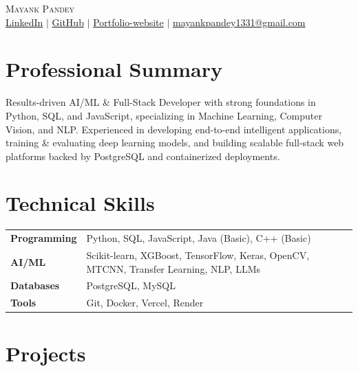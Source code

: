 \documentclass[letterpaper,10pt]{article}
\begin{document}
\begin{center}
    {\Huge \scshape Mayank Pandey} \\ \vspace{4pt}
    \small 
    \href{https://linkedin.com/in/mayank-pandey1331}{LinkedIn} 
    $|$ \href{https://github.com/MAYANK479}{GitHub} 
    $|$ \href{https://portfolio-mayank-projects1.vercel.app}{Portfolio-website} 
    $|$ \href{mailto:mayankpandey1331@gmail.com}{mayankpandey1331@gmail.com}
\end{center}

\section{Professional Summary}
\small{Results-driven AI/ML \& Full-Stack Developer with strong foundations in Python, SQL, and JavaScript, specializing in Machine Learning, Computer Vision, and NLP. Experienced in developing end-to-end intelligent applications, training \& evaluating deep learning models, and building scalable full-stack web platforms backed by PostgreSQL and containerized deployments.}

\section{Technical Skills}
\begin{tabularx}{\textwidth}{@{}p{1.25in} X@{}}
\textbf{Programming} & Python, SQL, JavaScript, Java (Basic), C++ (Basic) \\
\textbf{AI/ML} & Scikit-learn, XGBoost, TensorFlow, Keras, OpenCV, MTCNN, Transfer Learning, NLP, LLMs \\
\textbf{Databases} & PostgreSQL, MySQL \\
\textbf{Tools} & Git, Docker, Vercel, Render \\
\end{tabularx}

\section{Projects}
\end{document}
